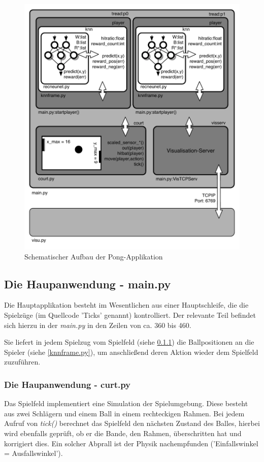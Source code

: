 \documentclass[12pt,twoside]{article}
\theoremstyle{plain}
\theoremstyle{definition}
\theoremstyle{remark}
\begin{document}
\begin{figure}[hbtp]
	 \centerline{\includegraphics[]{ApplicationArchitecture.pdf}}
	 {\caption{Schematischer Aufbau der Pong-Applikation}\label{fig:ApplicationArchitecture}}
\end{figure}


\subsection{Die Haupanwendung - main.py}
\label{main.py}

Die Hauptapplikation besteht im Wesentlichen aus einer Hauptschleife, die die Spielzüge (im Quellcode 'Ticks' genannt) kontrolliert. Der relevante Teil befindet sich hierzu in der \textit{main.py} in den Zeilen von ca. 360 bis 460.

Sie liefert in jedem Spielzug vom Spielfeld (siehe \ref{curt.py}) die Ballpositionen an die Spieler (siehe \ref{knnframe.py}), um anschließend deren Aktion wieder dem Spielfeld zuzuführen.

\subsubsection{Die Haupanwendung - curt.py}
\label{curt.py}
Das Spielfeld implementiert eine Simulation der Spielumgebung. Diese besteht aus zwei Schlägern und einem Ball in einem rechteckigen Rahmen. Bei jedem Aufruf von \textit{tick()} berechnet das Spielfeld den nächsten Zustand des Balles, hierbei wird ebenfalls geprüft, ob er die Bande, den Rahmen, überschritten hat und korrigiert dies. Ein solcher Abprall ist der Physik nachempfunden ('Einfallswinkel = Ausfallswinkel').
\end{document}
